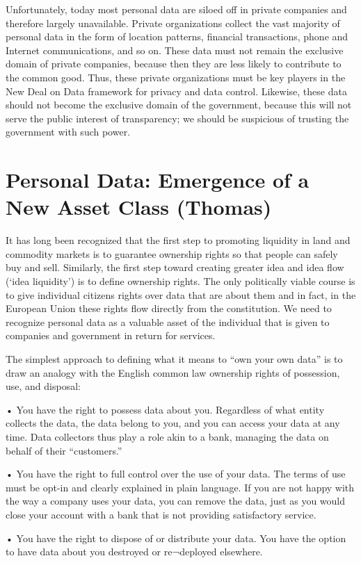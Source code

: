 Unfortunately, today most personal data are siloed off in private companies and therefore largely unavailable.
Private organizations collect the vast majority of personal data in the form of location patterns, financial transactions, phone and Internet communications, and so on.
These data must not remain the exclusive domain of private companies, because then they are less likely to contribute to the common good.
Thus, these private organizations must be key players in the New Deal on Data framework for privacy and data control.
Likewise, these data should not become the exclusive domain of the government, because this will not serve the public interest of transparency; we should be suspicious of trusting the government with such power.

\section{Personal Data: Emergence of a New Asset Class (Thomas)}

It has long been recognized that the first step to promoting liquidity in land and commodity markets is to guarantee ownership rights so that people can safely buy and sell.
Similarly, the first step toward creating greater idea and idea flow (`idea liquidity’) is to define ownership rights.
The only politically viable course is to give individual citizens rights over data that are about them and in fact, in the European Union these rights flow directly from the constitution.
We need to recognize personal data as a valuable asset of the individual that is given to companies and government in return for services.

The simplest approach to defining what it means to “own your own data” is to draw an analogy with the English common law ownership rights of possession, use, and disposal:

• You have the right to possess data about you. Regardless of what entity collects the data, the data belong to you, and you can access your data at any time. Data collectors thus play a role akin to a bank, managing the data on behalf of their “customers.”

• You have the right to full control over the use of your data. The terms of use must be opt-in and clearly explained in plain language. If you are not happy with the way a company uses your data, you can remove the data, just as you would close your account with a bank that is not providing satisfactory service.

• You have the right to dispose of or distribute your data. You have the option to have data about you destroyed or re¬deployed elsewhere.

